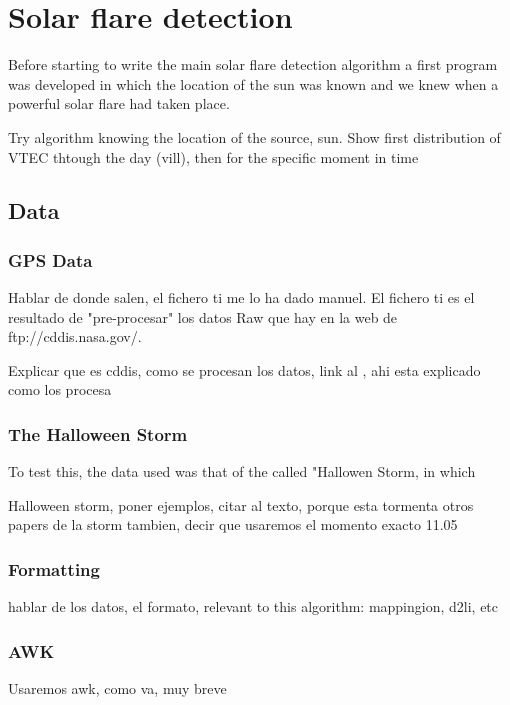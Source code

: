 \chapter{Solar flare detection}

Before starting to write the main solar flare detection algorithm a first program was developed in which the location of the sun was known and we knew when a powerful solar flare had taken place.

Try algorithm knowing the location of the source, sun. Show first distribution of VTEC thtough the day (vill), then for the specific moment in time

\section{Data}

\subsection{GPS Data}

Hablar de donde salen, el fichero ti me lo ha dado manuel. El fichero ti es el resultado de "pre-procesar" los datos Raw que hay en la web de ftp://cddis.nasa.gov/.

Explicar que es cddis, como se procesan los datos, link al \cite{hernandez2009igs}, ahi esta explicado como los procesa

\subsection{The Halloween Storm}

To test this, the data used was that of the called "Hallowen Storm, in which 

Halloween storm, poner ejemplos, citar al texto, porque esta tormenta otros papers de la storm tambien, decir que usaremos el momento exacto 11.05

\subsection{Formatting}
hablar de los datos, el formato, relevant to this algorithm: mappingion, d2li, etc

\subsection{AWK}

Usaremos awk, como va, muy breve



